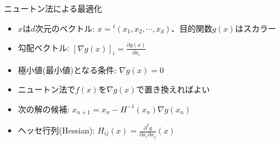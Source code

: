 \begin{frame}[t,fragile]{ニュートン法による最適化}
  \begin{itemize}
    \setlength{\itemsep}{1em}
  \item $x$は$d$次元のベクトル: $x = {}^t(x_1,x_2,\cdots,x_d)$、目的関数$g(x)$はスカラー
  \item 勾配ベクトル: $\displaystyle [\nabla g(x)]_i = \frac{\partial g(x)}{\partial x_i}$
  \item 極小値(最小値)となる条件: $\nabla g(x)=0$
  \item ニュートン法で$f(x)$を$\nabla g(x)$で置き換えればよい
  \item 次の解の候補: $\displaystyle x_{n+1} = x_n - H^{-1}(x_n) \nabla g(x_n)$
  \item ヘッセ行列(Hessian): $\displaystyle H_{ij}(x) = \frac{\partial^2 g}{\partial x_i \partial x_j}(x)$
  \end{itemize}
\end{frame}
